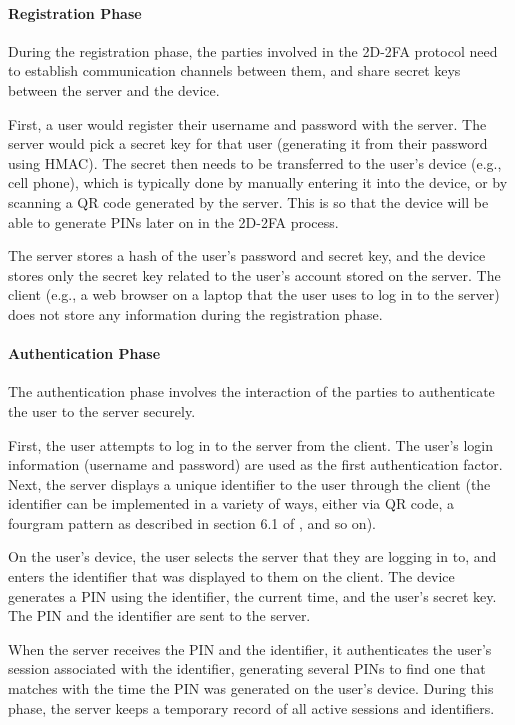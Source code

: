 \documentclass[11pt]{article} %
\begin{document}
\paragraph{Registration Phase}
During the registration phase, the parties involved in the 2D-2FA
protocol need to establish communication channels between them, and
share secret keys between the server and the device. 

First, a user would register their username and password with the
server. The server would pick a secret key for that user (generating it
from their password using HMAC). The secret then needs to be transferred
to the user's device (e.g., cell phone), which is typically done by
manually entering it into the device, or by scanning a QR code generated
by the server. This is so that the device will be able to generate PINs
later on in the 2D-2FA process. 

The server stores a hash of the user's password and secret key, and the
device stores only the secret key related to the user's account stored
on the server. The client (e.g., a web browser on a laptop that the user
uses to log in to the server) does not store any information during the
registration phase. 

\paragraph{Authentication Phase}
The authentication phase involves the interaction of the parties to
authenticate the user to the server securely. 

First, the user attempts to log in to the server from the client. The
user's login information (username and password) are used as the first
authentication factor. Next, the server displays a unique identifier to
the user through the client (the identifier can be implemented in a
variety of ways, either via QR code, a fourgram pattern as described in
section 6.1 of \cite{shirvanian2d2fa}, and so on). 

On the user's device, the user selects the server that they are logging
in to, and enters the identifier that was displayed to them on the
client. The device generates a PIN using the identifier, the current
time, and the user's secret key. The PIN and the identifier are sent to
the server.

When the server receives the PIN and the identifier, it authenticates
the user's session associated with the identifier, generating several
PINs to find one that matches with the time the PIN was generated on the
user's device. During this phase, the server keeps a temporary record of
all active sessions and identifiers.
\end{document}
